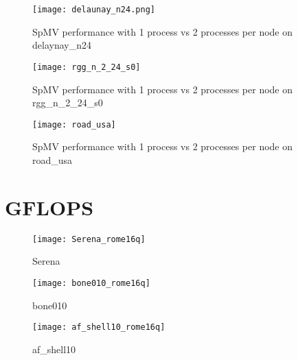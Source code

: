 \begin{figure}[H]
    \centering
    \texttt{[image: delaunay\_n24.png]}
    \caption{SpMV performance with 1 process vs 2 processes per node on delaynay\_n24}
    \label{fig:delaunayflops}
\end{figure}

\begin{figure}[H]
    \begin{center}
        \texttt{[image: rgg\_n\_2\_24\_s0]}
    \end{center}
    \caption{SpMV performance with 1 process vs 2 processes per node on rgg\_n\_2\_24\_s0}
    \label{fig:rgg_n_2_24_s0}
\end{figure}

\begin{figure}[H]
    \begin{center}
        \texttt{[image: road\_usa]}
    \end{center}
    \caption{SpMV performance with 1 process vs 2 processes per node on road\_usa}
    \label{fig:road_usa}
\end{figure}


\section{GFLOPS \romeq}

\begin{figure}[H]
    \begin{center}
        \texttt{[image: Serena\_rome16q]}
    \end{center}
    \caption{Serena}
    \label{fig:Serena_rome16q}
\end{figure}

\begin{figure}[H]
    \begin{center}
        \texttt{[image: bone010\_rome16q]}
    \end{center}
    \caption{bone010}
    \label{fig:bone010_rome16q}
\end{figure}

\begin{figure}[H]
    \begin{center}
        \texttt{[image: af\_shell10\_rome16q]}
    \end{center}
    \caption{af\_shell10}
    \label{fig:af_shell10_rome16q}
\end{figure}

